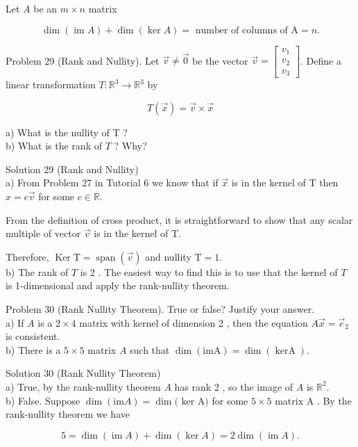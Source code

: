 \documentclass[10pt]{article}
\begin{document}
Let $A$ be an $m \times n$ matrix

$$
\operatorname{dim}(\operatorname{im} A)+\operatorname{dim}(\operatorname{ker} A)=\text { number of columns of } \mathrm{A}=n .
$$

Problem 29 (Rank and Nullity). Let $\vec{v} \neq \overrightarrow{0}$ be the vector $\vec{v}=\left[\begin{array}{c}v_{1} \\ v_{2} \\ v_{3}\end{array}\right]$. Define a linear transformation $T: \mathbb{R}^{3} \rightarrow \mathbb{R}^{3}$ by

$$
T(\vec{x})=\vec{v} \times \vec{x}
$$

a) What is the nullity of T ?\\
b) What is the rank of $T$ ? Why?

Solution 29 (Rank and Nullity)\\
a) From Problem 27 in Tutorial 6 we know that if $\vec{x}$ is in the kernel of T then $x=c \vec{v}$ for some $c \in \mathbb{R}$.

From the definition of cross product, it is straightforward to show that any scalar multiple of vector $\vec{v}$ is in the kernel of T.

Therefore, $\operatorname{Ker} \mathrm{T}=\operatorname{span}(\vec{v})$ and nullity $\mathrm{T}=1$.\\
b) The rank of $T$ is 2 . The easiest way to find this is to use that the kernel of $T$ is 1-dimensional and apply the rank-nullity theorem.

Problem 30 (Rank Nullity Theorem). True or false? Justify your answer.\\
a) If $A$ is a $2 \times 4$ matrix with kernel of dimension 2 , then the equation $A \vec{x}=\vec{e}_{2}$ is consistent.\\
b) There is a $5 \times 5$ matrix $A$ such that $\operatorname{dim}(\mathrm{imA})=\operatorname{dim}(\operatorname{kerA})$.

Solution 30 (Rank Nullity Theorem)\\
a) True, by the rank-nullity theorem $A$ has rank 2 , so the image of $A$ is $\mathbb{R}^{2}$.\\
b) False. Suppose $\operatorname{dim}(\mathrm{im} A)=\operatorname{dim}($ ker A$)$ for some $5 \times 5$ matrix A . By the rank-nullity theorem we have

$$
5=\operatorname{dim}(\operatorname{im} A)+\operatorname{dim}(\operatorname{ker} A)=2 \operatorname{dim}(\operatorname{im} A) .
$$
\end{document}
